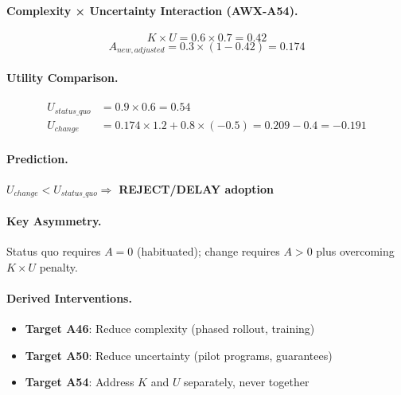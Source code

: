 \paragraph{Complexity × Uncertainty Interaction (AWX-A54).}
\begin{equation}
K \times U = 0.6 \times 0.7 = 0.42
\end{equation}
\begin{equation}
A_{new,adjusted} = 0.3 \times (1 - 0.42) = 0.174
\end{equation}

\paragraph{Utility Comparison.}
\begin{align}
U_{status\_quo} &= 0.9 \times 0.6 = \mathbf{0.54} \\
U_{change} &= 0.174 \times 1.2 + 0.8 \times (-0.5) = 0.209 - 0.4 = \mathbf{-0.191}
\end{align}

\paragraph{Prediction.}
$U_{change} < U_{status\_quo} \Rightarrow$ \textbf{REJECT/DELAY adoption}

\paragraph{Key Asymmetry.}
Status quo requires $A = 0$ (habituated); change requires $A > 0$ plus overcoming $K \times U$ penalty.

\paragraph{Derived Interventions.}
\begin{itemize}
    \item \textbf{Target A46}: Reduce complexity (phased rollout, training)
    \item \textbf{Target A50}: Reduce uncertainty (pilot programs, guarantees)
    \item \textbf{Target A54}: Address $K$ and $U$ separately, never together
\end{itemize}


